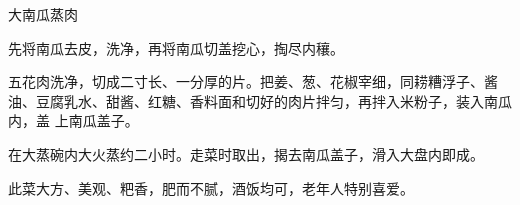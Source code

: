 \begin{recipe}[一品南瓜蒸肉]{大南瓜蒸肉}

\ingredients


\cooking

\step 先将南瓜去皮，洗净，再将南瓜切盖挖心，掏尽内穰。

\step 五花肉洗净，切成二寸长、一分厚的片。把姜、葱、花椒宰细，同耢糟浮子、酱
油、豆腐乳水、甜酱、红糖、香料面和切好的肉片拌匀，再拌入米粉子，装入南瓜内，盖
上南瓜盖子。

\step 在大蒸碗内大火蒸约二小时。走菜时取出，揭去南瓜盖子，滑入大盘内即成。

\features

此菜大方、美观、粑香，肥而不腻，酒饭均可，老年人特别喜爱。

\end{recipe}

